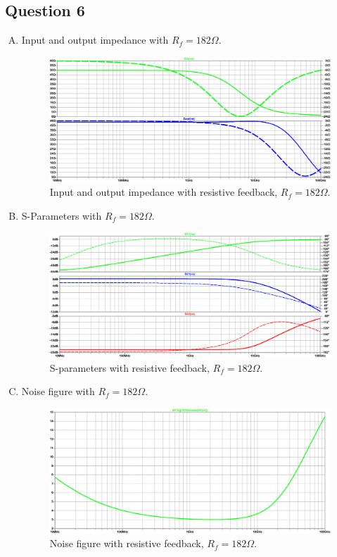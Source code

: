\documentclass{article}
\begin{document}
\subsection{Question 6}
\label{sec:org7f8d6c7}
\begin{enumerate}[A.]
\item Input and output impedance with \(R_{f} = 182 \Omega\).

\begin{figure}[H]
\centering
\includegraphics[width=.9\linewidth]{img/q6/zin-zout-r-matched.pdf}
\caption{\label{fig:zin-zout-r-matched-q6}Input and output impedance with resistive feedback, \(R_{f} = 182 \Omega\).}
\end{figure}

\item S-Parameters with \(R_{f} = 182 \Omega\).

\begin{figure}[H]
\centering
\includegraphics[width=.9\linewidth]{img/q6/s-r-matched.pdf}
\caption{\label{fig:s-r-matched-q6}S-parameters with resistive feedback, \(R_{f} = 182 \Omega\).}
\end{figure}

\item Noise figure with \(R_{f} = 182 \Omega\).

\begin{figure}[H]
\centering
\includegraphics[width=.9\linewidth]{img/q6/noise-r-matched.pdf}
\caption{\label{fig:noise-r-matched-q6}Noise figure with resistive feedback, \(R_{f} = 182 \Omega\).}
\end{figure}


\end{enumerate}
\end{document}
